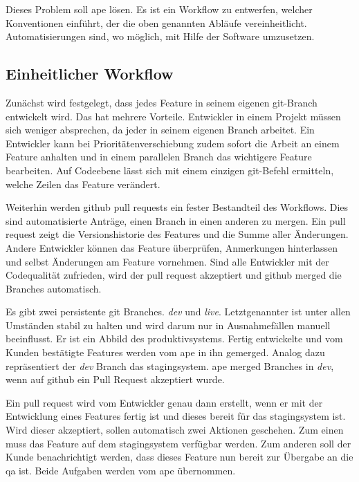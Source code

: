 Dieses Problem soll \gls{ape} lösen. Es ist ein Workflow zu entwerfen, welcher Konventionen einführt, der die oben genannten Abläufe vereinheitlicht. Automatisierungen sind, wo möglich, mit Hilfe der Software umzusetzen.


\subsection{Einheitlicher Workflow} %
\label{sub:einheitlicher_workflow}

Zunächst wird festgelegt, dass jedes Feature in seinem eigenen \gls{git}-Branch entwickelt wird. Das hat mehrere Vorteile. Entwickler in einem Projekt müssen sich weniger absprechen, da jeder in seinem eigenen Branch arbeitet. Ein Entwickler kann bei Prioritätenverschiebung zudem sofort die Arbeit an einem Feature anhalten und in einem parallelen Branch das wichtigere Feature bearbeiten. Auf Codeebene lässt sich mit einem einzigen \gls{git}-Befehl ermitteln, welche Zeilen das Feature verändert.

Weiterhin werden \gls{github} \glspl{pull request} ein fester Bestandteil des Workflows. Dies sind automatisierte Anträge, einen Branch in einen anderen zu mergen. Ein \gls{pull request} zeigt die Versionshistorie des Features und die Summe aller Änderungen. Andere Entwickler können das Feature überprüfen, Anmerkungen hinterlassen und selbst Änderungen am Feature vornehmen. Sind alle Entwickler mit der Codequalität zufrieden, wird der \gls{pull request} akzeptiert und \gls{github} merged die Branches automatisch.

Es gibt zwei persistente \gls{git} Branches. \emph{dev} und \emph{live}. Letztgenannter ist unter allen Umständen stabil zu halten und wird darum nur in Ausnahmefällen manuell beeinflusst. Er ist ein Abbild des \gls{produktivsystem}s. Fertig entwickelte und vom Kunden bestätigte Features werden vom \gls{ape} in ihn gemerged. Analog dazu repräsentiert der \emph{dev} Branch das \gls{stagingsystem}. \gls{ape} merged Branches in \emph{dev}, wenn auf \gls{github} ein Pull Request akzeptiert wurde.

Ein \gls{pull request} wird vom Entwickler genau dann erstellt, wenn er mit der Entwicklung eines Features fertig ist und dieses bereit für das \gls{stagingsystem} ist. Wird dieser akzeptiert, sollen automatisch zwei Aktionen geschehen. Zum einen muss das Feature auf dem \gls{stagingsystem} verfügbar werden. Zum anderen soll der Kunde benachrichtigt werden, dass dieses Feature nun bereit zur Übergabe an die \gls{qa} ist. Beide Aufgaben werden vom \gls{ape} übernommen.

